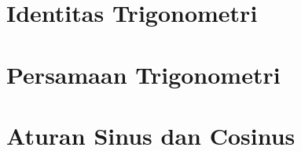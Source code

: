 \documentclass[pdflatex,compress,mathserif]{beamer}
\begin{document}
\section{Identitas Trigonometri}

\section{Persamaan Trigonometri}

\section{Aturan Sinus dan Cosinus}
\end{document}
